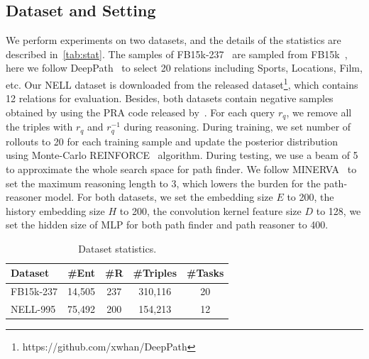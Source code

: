 \documentclass[11pt,a4paper]{article}
\begin{document}
\subsection{Dataset and Setting}
We perform experiments on two datasets, and the details of the statistics are described in~\autoref{tab:stat}. The samples of FB15k-237~\cite{toutanova2015representing} are sampled from FB15k~\cite{bordes2013translating}, here we follow DeepPath~\cite{xiong2017deeppath} to select 20 relations including Sports, Locations, Film, etc. Our NELL dataset is downloaded from the released dataset\footnote{https://github.com/xwhan/DeepPath}, which contains 12 relations for evaluation. Besides, both datasets contain negative samples obtained by using the PRA code released by~. For each query $r_q$, we remove all the triples with $r_q$ and $r_q^{-1}$ during reasoning. During training, we set number of rollouts to 20 for each training sample and update the posterior distribution using Monte-Carlo REINFORCE~\cite{williams1992simple} algorithm. During testing, we use a beam of 5 to approximate the whole search space for path finder. We follow MINERVA~\cite{das2017go} to set the maximum reasoning length to 3, which lowers the burden for the path-reasoner model. For both datasets, we set the embedding size $E$ to 200, the history embedding size $H$ to 200, the convolution kernel feature size $D$ to 128, we set the hidden size of MLP for both path finder and path reasoner to 400.
\begin{table}[t]
\centering
\small
\begin{tabular}{|l|c|c|c|c|}
\hline
Dataset & \#Ent & \#R & \#Triples & \#Tasks\\
\hline
FB15k-237 & 14,505 & 237 & 310,116 & 20\\
\hline
NELL-995 & 75,492 & 200 & 154,213 & 12\\
\hline
\end{tabular}
\caption{Dataset statistics.}
\label{tab:stat}
\end{table}
\end{document}
